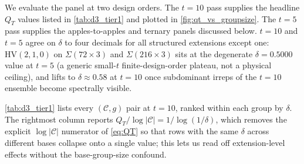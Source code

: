 \documentclass[twocolumn,superscriptaddress,showpacs,nofootinbib,notitlepage,preprintnumbers,secnumarabic,amssymb, nobibnotes, aps, prd]{revtex4-2}
\newcommand{\QT}{Q_{T}}              %
\newcommand{\HV}[3]{\mathrm{HV}(#1,#2,#3)} %
\newcommand{\Sigmathree}[1]{\Sigma(#1\!\times\!3)} %
\begin{document}
We evaluate the panel at two design orders. The $t=10$ pass supplies the headline $\QT$ values listed in \cref{tab:d3_tier1} and plotted in \cref{fig:qt_vs_groupsize}. The $t=5$ pass supplies the apples-to-apples and ternary panels discussed below. $t=10$ and $t=5$ agree on $\delta$ to four decimals for all structured extensions except one: $\HV{2}{1}{0}$ on $\Sigmathree{72}$ and $\Sigmathree{216}$ sits at the degenerate $\delta=0.5000$ value at $t=5$ (a generic small-$t$ finite-design-order plateau, not a physical ceiling), and lifts to $\delta\approx 0.58$ at $t=10$ once subdominant irreps of the $t{=}10$ ensemble become spectrally visible.

\cref{tab:d3_tier1} lists every $(\mathcal{C},g)$ pair at $t=10$, ranked within each group by $\delta$. The rightmost column reports $\QT/\log|\mathcal{C}| = 1/\log(1/\delta)$, which removes the explicit $\log|\mathcal{C}|$ numerator of \cref{eq:QT} so that rows with the same $\delta$ across different bases collapse onto a single value; this lets us read off extension-level effects without the base-group-size confound.
\end{document}
